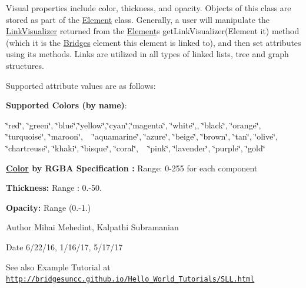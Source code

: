 Visual properties include color, thickness, and opacity. Objects of this class are stored as part of the \hyperlink{namespace_element}{Element} class. Generally, a user will manipulate the \hyperlink{class_link_visualizer_1_1_link_visualizer}{Link\+Visualizer} returned from the \hyperlink{namespace_element}{Element}\textquotesingle{}s get\+Link\+Visualizer(\+Element it) method (which it is the \hyperlink{namespace_bridges}{Bridges} element this element is linked to), and then set attributes using its methods. Links are utilized in all types of linked lists, tree and graph structures.

Supported attribute values are as follows\+:

{\bfseries Supported Colors (by name)}\+: 

\char`\"{}red\char`\"{}, \char`\"{}green\char`\"{}, \char`\"{}blue\char`\"{},\char`\"{}yellow\char`\"{},\char`\"{}cyan\char`\"{},\char`\"{}magenta\char`\"{}, \char`\"{}white\char`\"{},, \char`\"{}black\char`\"{}, \char`\"{}orange\char`\"{}, \char`\"{}turquoise\char`\"{}, \char`\"{}maroon\char`\"{}, ~\newline
 \char`\"{}aquamarine\char`\"{}, \char`\"{}azure\char`\"{}, \char`\"{}beige\char`\"{}, \char`\"{}brown\char`\"{}, \char`\"{}tan\char`\"{}, \char`\"{}olive\char`\"{}, \char`\"{}chartreuse\char`\"{}, \char`\"{}khaki\char`\"{}, \char`\"{}bisque\char`\"{}, \char`\"{}coral\char`\"{}, ~\newline
 \char`\"{}pink\char`\"{}, \char`\"{}lavender\char`\"{}, \char`\"{}purple\char`\"{}, \char`\"{}gold\char`\"{} 

{\bfseries  \hyperlink{namespace_color}{Color} by R\+G\+B\+A Specification \+:} Range\+: 0-\/255 for each component 

{\bfseries  Thickness\+: } Range \+: 0.-\/50.

{\bfseries  Opacity\+: } Range (0.-\/1.) 

\begin{DoxyAuthor}{Author}
Mihai Mehedint, Kalpathi Subramanian
\end{DoxyAuthor}
\begin{DoxyDate}{Date}
6/22/16, 1/16/17, 5/17/17
\end{DoxyDate}
\begin{DoxySeeAlso}{See also}
Example Tutorial at ~\newline
 \href{http://bridgesuncc.github.io/Hello_World_Tutorials/SLL.html}{\tt http\+://bridgesuncc.\+github.\+io/\+Hello\+\_\+\+World\+\_\+\+Tutorials/\+S\+L\+L.\+html} 
\end{DoxySeeAlso}


